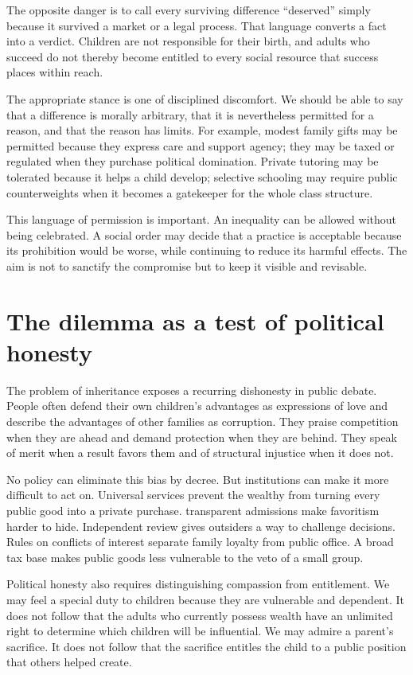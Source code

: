 ﻿\documentclass[12pt,a4paper]{book}
\begin{document}
The opposite danger is to call every surviving difference ``deserved'' simply
because it survived a market or a legal process.  That language converts a
fact into a verdict.  Children are not responsible for their birth, and
adults who succeed do not thereby become entitled to every social resource
that success places within reach.

The appropriate stance is one of disciplined discomfort.  We should be able
to say that a difference is morally arbitrary, that it is nevertheless
permitted for a reason, and that the reason has limits.  For example, modest
family gifts may be permitted because they express care and support agency;
they may be taxed or regulated when they purchase political domination.
Private tutoring may be tolerated because it helps a child develop;
selective schooling may require public counterweights when it becomes a
gatekeeper for the whole class structure.

This language of permission is important.  An inequality can be allowed
without being celebrated.  A social order may decide that a practice is
acceptable because its prohibition would be worse, while continuing to
reduce its harmful effects.  The aim is not to sanctify the compromise but
to keep it visible and revisable.

\section{The dilemma as a test of political honesty}

The problem of inheritance exposes a recurring dishonesty in public debate.
People often defend their own children's advantages as expressions of love
and describe the advantages of other families as corruption.  They praise
competition when they are ahead and demand protection when they are behind.
They speak of merit when a result favors them and of structural injustice
when it does not.

No policy can eliminate this bias by decree.  But institutions can make it
more difficult to act on.  Universal services prevent the wealthy from
turning every public good into a private purchase.  transparent admissions
make favoritism harder to hide.  Independent review gives outsiders a way
to challenge decisions.  Rules on conflicts of interest separate family
loyalty from public office.  A broad tax base makes public goods less
vulnerable to the veto of a small group.

Political honesty also requires distinguishing compassion from entitlement.
We may feel a special duty to children because they are vulnerable and
dependent.  It does not follow that the adults who currently possess wealth
have an unlimited right to determine which children will be influential.  We
may admire a parent's sacrifice.  It does not follow that the sacrifice
entitles the child to a public position that others helped create.
\end{document}
